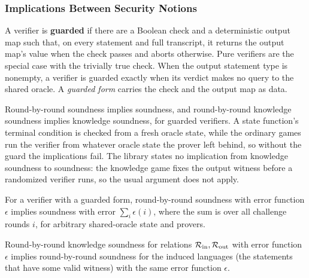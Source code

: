\subsubsection{Implications Between Security Notions}

\begin{definition}
    \label{def:guarded_verifier}
    A verifier is \textbf{guarded} if there are a Boolean check and a deterministic output map
    such that, on every statement and full transcript, it returns the output map's value when the
    check passes and aborts otherwise. Pure verifiers are the special case with the trivially true
    check. When the output statement type is nonempty, a verifier is guarded exactly when its
    verdict makes no query to the shared oracle. A \emph{guarded form} carries the check and the
    output map as data.
    \leanok
\end{definition}

Round-by-round soundness implies soundness, and round-by-round knowledge soundness implies knowledge
soundness, for guarded verifiers. A state function's terminal condition is checked from a fresh
oracle state, while the ordinary games run the verifier from whatever oracle state the prover left
behind, so without the guard the implications fail. The library states no implication from
knowledge soundness to soundness: the knowledge game fixes the output witness before a randomized
verifier runs, so the usual argument does not apply.

\begin{theorem}
    \label{thm:rbr_soundness_implies_soundness}
    For a verifier with a guarded form, round-by-round soundness with error function \(\epsilon\)
    implies soundness with error \(\sum_i \epsilon(i)\), where the sum is over all challenge rounds
    \(i\), for arbitrary shared-oracle state and provers.
    \leanok
\end{theorem}

\begin{theorem}
    \label{thm:rbr_knowledge_soundness_implies_rbr_soundness}
    Round-by-round knowledge soundness for relations \(\mathcal{R}_{\mathrm{in}}, \mathcal{R}_{\mathrm{out}}\) with error
    function \(\epsilon\) implies round-by-round soundness for the induced languages (the statements
    that have some valid witness) with the same error function \(\epsilon\).
    \leanok
\end{theorem}

